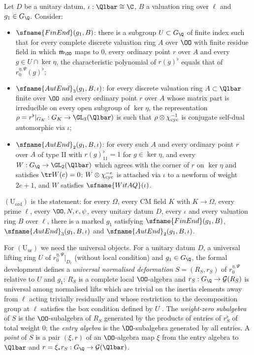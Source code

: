 \begin{definition}\label{pf:modularity:Uord}
Let $D$ be a unitary datum, $\iota:\Qlbar\cong\C$, $B$ a valuation ring over $\ell$ and $g_1\in G_\Q$. Consider:
\begin{itemize}
\item $\sfname{FinEnd}(g_1,B)$: there is a subgroup $U\subset G_\Q$ of finite index such that for every complete
discrete valuation ring $A$ over $\OO$ with finite residue field in which $\mathfrak m_\OO$ maps to $0$, every ordinary
point $r$ over $A$ and every $g\in U\cap\ker\eta$, the characteristic polynomial of $r(g)^\flat$ equals that of
$r_0^{\eta,\Psi}(g)^\flat$;
\item $\sfname{AutEnd}_3(g_1,B,\iota)$: for every discrete valuation ring $A\subset\Qlbar$ finite over $\OO$ and every
ordinary point $r$ over $A$ whose matrix part is irreducible on every open subgroup of $\ker\eta$, the representation
$\rho=r^\flat|_{G_K}:G_K\to\GL_3(\Qlbar)$ is such that $\rho\otimes\chi_{\mathrm{cyc}}^{-1}$ is conjugate self-dual
automorphic via $\iota$;
\item $\sfname{AutEnd}_2(g_1,B,\iota)$: for every such $A$ and every ordinary point $r$ over $A$ of type II with
$r(g)^\flat_{11}=1$ for $g\in\ker\eta$, and every $W:G_\Q\to\GL_2(\Qlbar)$ which agrees with the corner of $r$ on
$\ker\eta$ and satisfies $\tr W(c)=0$: $W\otimes\chi_{\mathrm{cyc}}^{-e}$ is attached via $\iota$ to a newform of weight
$2e+1$, and $W$ satisfies $\sfname{WitAQ}(\iota)$.
\end{itemize}
$(\mathrm{U}_{\mathrm{ord}})$ is the statement: for every $\Omega$, every CM field $K$ with $K\to\Omega$, every prime
$\ell$, every $\OO,N,e,\psi$, every unitary datum $D$, every $\iota$ and every valuation ring $B$ over $\ell$, there is
a marked $g_1$ satisfying $\sfname{FinEnd}(g_1,B)$, $\sfname{AutEnd}_3(g_1,B,\iota)$ and $\sfname{AutEnd}_2(g_1,B,\iota)$.
\end{definition}

For $(\mathrm{U}_{\mathrm{ur}})$ we need the universal objects. For a unitary datum $D$, a universal lifting ring $U$
of $r_0^{\eta,\Psi}|_{D_\ell}$ (without local condition) and $g_1\in G_\Q$, the formal development defines a
\emph{universal normalised deformation} $S=(R_S,r_S)$ of $r_0^{\eta,\Psi}$ relative to $U$ and $g_1$: $R_S$ is a complete
local $\OO$-algebra and $r_S:G_\Q\to\modularityG(R_S)$ is universal among normalised lifts which are trivial on the
inertia elements away from $\ell$ acting trivially residually and whose restriction to the decomposition group at $\ell$
satisfies the box condition defined by $U$ \cite{LeanSource2026}. The
\emph{weight-zero subalgebra}
of $S$ is the $\OO$-subalgebra of $R_S$ generated by the products of entries of $r_S^\flat$ of total weight $0$; the
\emph{entry algebra} is the $\OO$-subalgebra generated by all entries. A \emph{point} of $S$ is a pair $(\xi,r)$ of an
$\OO$-algebra map $\xi$ from the entry algebra to $\Qlbar$ and $r=\xi_\ast r_S:G_\Q\to\modularityG(\Qlbar)$.

